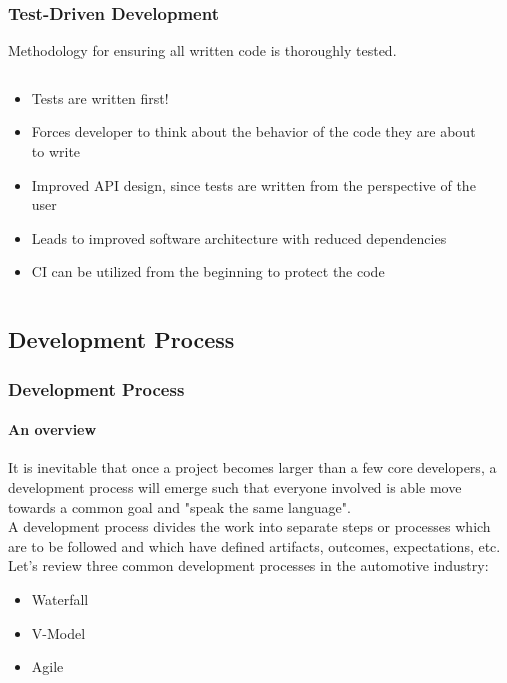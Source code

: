 \begin{frame}
\frametitle{Test-Driven Development}
Methodology for ensuring all written code is thoroughly tested.
\begin{columns}[]
    \begin{column}{0.6\textwidth}
        \begin{itemize}
            \item Tests are written first!
            \item Forces developer to think about the behavior of the code
                they are about to write
            \item Improved API design, since tests are written from the
                perspective of the user
            \item Leads to improved software architecture with reduced
                dependencies
            \item CI can be utilized from the beginning to protect the code
        \end{itemize}
    \end{column}
    \begin{column}{0.4\textwidth}
        \centering
    \end{column}
\end{columns}
\end{frame}

\subsection{Development Process}

\begin{frame}
\frametitle{Development Process}
\framesubtitle{An overview}
It is inevitable that once a project becomes larger than a few core developers,
a development process will emerge such that everyone involved is able move
towards a common goal and "speak the same language".\\

A development process divides the work into separate steps or processes which
are to be followed and which have defined artifacts, outcomes, expectations,
etc.\\

Let's review three common development processes in the automotive industry:
\begin{itemize}
    \item Waterfall
    \item V-Model
    \item Agile
\end{itemize}
\end{frame}

